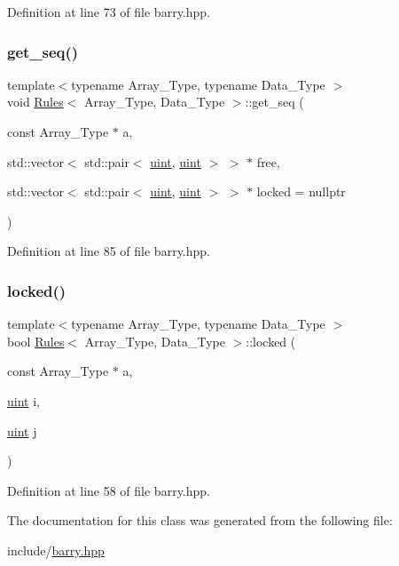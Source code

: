 Definition at line 73 of file barry.\+hpp.

\mbox{\label{classbarry_1_1_rules_a7b8f29955ec52f49808d7ea1cd4eaf5e}} 
\subsubsection{\texorpdfstring{get\+\_\+seq()}{get\_seq()}}
{\footnotesize\ttfamily template$<$typename Array\+\_\+\+Type, typename Data\+\_\+\+Type $>$ \\
void \hyperlink{classbarry_1_1_rules}{Rules}$<$ Array\+\_\+\+Type, Data\+\_\+\+Type $>$\+::get\+\_\+seq (\begin{DoxyParamCaption}\item[{const Array\+\_\+\+Type $\ast$}]{a,  }\item[{std\+::vector$<$ std\+::pair$<$ \hyperlink{namespacebarry_a11dfc53ddb4672278319aa04f1e09a6c}{uint}, \hyperlink{namespacebarry_a11dfc53ddb4672278319aa04f1e09a6c}{uint} $>$ $>$ $\ast$}]{free,  }\item[{std\+::vector$<$ std\+::pair$<$ \hyperlink{namespacebarry_a11dfc53ddb4672278319aa04f1e09a6c}{uint}, \hyperlink{namespacebarry_a11dfc53ddb4672278319aa04f1e09a6c}{uint} $>$ $>$ $\ast$}]{locked = {\ttfamily nullptr} }\end{DoxyParamCaption})\hspace{0.3cm}{\ttfamily [inline]}}



Definition at line 85 of file barry.\+hpp.

\mbox{\label{classbarry_1_1_rules_a4e08a6b3d8b536cb1717c62192a91537}} 
\subsubsection{\texorpdfstring{locked()}{locked()}}
{\footnotesize\ttfamily template$<$typename Array\+\_\+\+Type, typename Data\+\_\+\+Type $>$ \\
bool \hyperlink{classbarry_1_1_rules}{Rules}$<$ Array\+\_\+\+Type, Data\+\_\+\+Type $>$\+::locked (\begin{DoxyParamCaption}\item[{const Array\+\_\+\+Type $\ast$}]{a,  }\item[{\hyperlink{namespacebarry_a11dfc53ddb4672278319aa04f1e09a6c}{uint}}]{i,  }\item[{\hyperlink{namespacebarry_a11dfc53ddb4672278319aa04f1e09a6c}{uint}}]{j }\end{DoxyParamCaption})\hspace{0.3cm}{\ttfamily [inline]}}



Definition at line 58 of file barry.\+hpp.



The documentation for this class was generated from the following file\+:\begin{DoxyCompactItemize}
\item 
include/\hyperlink{barry_8hpp}{barry.\+hpp}\end{DoxyCompactItemize}
